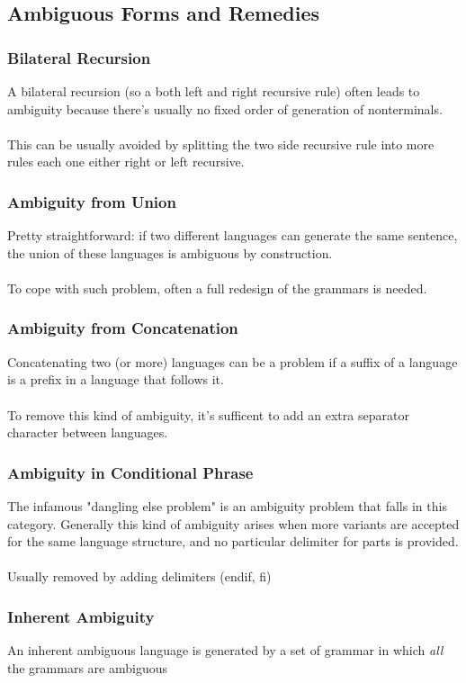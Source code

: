\documentclass[10pt,a4paper]{article}
\begin{document}
			\subsection{Ambiguous Forms and Remedies}
				\subsubsection{Bilateral Recursion}
					A bilateral recursion (so a both left and right recursive rule) often leads to ambiguity because there's usually no fixed order of generation of nonterminals.\\\\
					This can be usually avoided by splitting the two side recursive rule into more rules each one either right or left recursive.\\
				\subsubsection{Ambiguity from Union}
					Pretty straightforward: if two different languages can generate the same sentence, the union of these languages is ambiguous by construction.\\\\
					To cope with such problem, often a full redesign of the grammars is needed.\\
				\subsubsection{Ambiguity from Concatenation}
					Concatenating two (or more) languages can be a problem if a suffix of a language is a prefix in a language that follows it.\\\\
					To remove this kind of ambiguity, it's sufficent to add an extra separator character between languages.\\
				\subsubsection{Ambiguity in Conditional Phrase}
					The infamous "dangling else problem" is an ambiguity problem that falls in this category. Generally this kind of ambiguity arises when more variants are accepted for the same language structure, and no particular delimiter for parts is provided.\\\\
					Usually removed by adding delimiters (endif, fi)\\
				\subsubsection{Inherent Ambiguity}
					An inherent ambiguous language is generated by a set of grammar in which \emph{all} the grammars are ambiguous\\					
		
\end{document}
